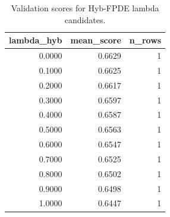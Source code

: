 \begin{table}[t]
\caption{Validation scores for Hyb-FPDE lambda candidates.}
\label{tab:lambda_distribution_computed}
\centering
\begin{tabular}{rrr}
\toprule
lambda\_hyb & mean\_score & n\_rows \\
\midrule
0.0000 & 0.6629 & 1 \\
0.1000 & 0.6625 & 1 \\
0.2000 & 0.6617 & 1 \\
0.3000 & 0.6597 & 1 \\
0.4000 & 0.6587 & 1 \\
0.5000 & 0.6563 & 1 \\
0.6000 & 0.6547 & 1 \\
0.7000 & 0.6525 & 1 \\
0.8000 & 0.6502 & 1 \\
0.9000 & 0.6498 & 1 \\
1.0000 & 0.6447 & 1 \\
\bottomrule
\end{tabular}

\end{table}
